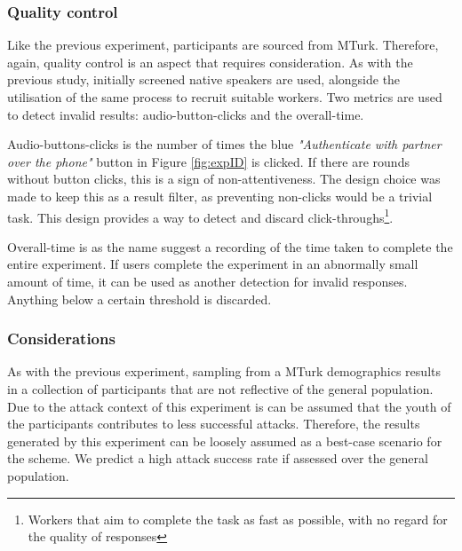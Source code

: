 \subsubsection{Quality control}
\label{sec:exp2_quality}
Like the previous experiment, participants are sourced from MTurk. Therefore, again, quality control is an aspect that requires consideration. As with the previous study, initially screened native speakers are used, alongside the utilisation of the same process to recruit suitable workers. Two metrics are used to detect invalid results: audio-button-clicks and the overall-time. 

Audio-buttons-clicks is the number of times the blue \textit{"Authenticate with partner over the phone"} button in Figure \ref{fig:expID} is clicked. If there are rounds without button clicks, this is a sign of non-attentiveness. The design choice was made to keep this as a result filter, as preventing non-clicks would be a trivial task. This design provides a way to detect and discard click-throughs\footnote{Workers that aim to complete the task as fast as possible, with no regard for the quality of responses}. 

Overall-time is as the name suggest a recording of the time taken to complete the entire experiment. If users complete the experiment in an abnormally small amount of time, it can be used as another detection for invalid responses. Anything below a certain threshold is discarded.

\subsubsection{Considerations}
As with the previous experiment, sampling from a  MTurk demographics results in a collection of participants that are not reflective of the general population. Due to the attack context of this experiment is can be assumed that the youth of the participants contributes to less successful attacks. Therefore, the results generated by this experiment can be loosely assumed as a best-case scenario for the scheme. We predict a high attack success rate if assessed over the general population.